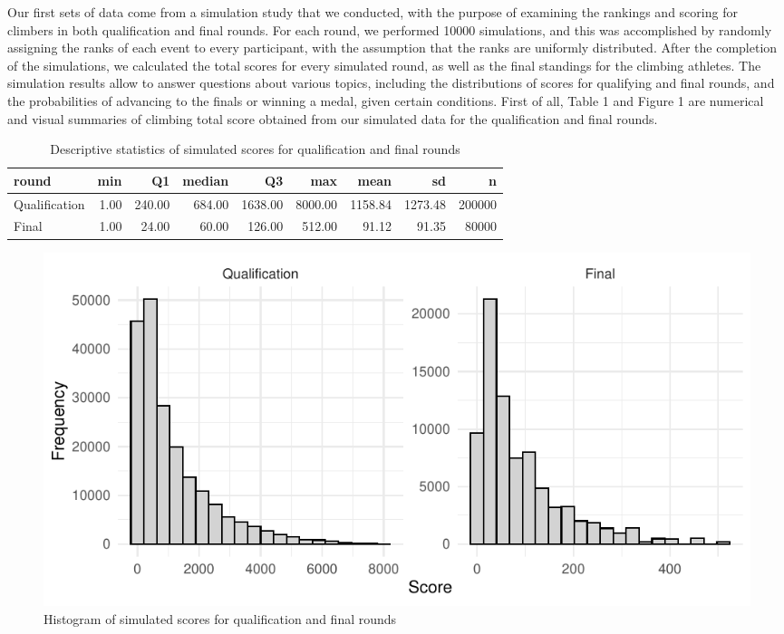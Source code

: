 \documentclass[12pt]{article}
\begin{document}
Our first sets of data come from a simulation study that we conducted,
with the purpose of examining the rankings and scoring for climbers in
both qualification and final rounds. For each round, we performed 10000
simulations, and this was accomplished by randomly assigning the ranks
of each event to every participant, with the assumption that the ranks
are uniformly distributed. After the completion of the simulations, we
calculated the total scores for every simulated round, as well as the
final standings for the climbing athletes. The simulation results allow
to answer questions about various topics, including the distributions of
scores for qualifying and final rounds, and the probabilities of
advancing to the finals or winning a medal, given certain conditions.
First of all, Table 1 and Figure 1 are numerical and visual summaries of
climbing total score obtained from our simulated data for the
qualification and final rounds.

\begin{table}[ht]
\centering
\caption{Descriptive statistics of simulated scores for qualification and final rounds} 
\begin{tabular}{lrrrrrrrr}
  \hline
round & min & Q1 & median & Q3 & max & mean & sd & n \\ 
  \hline
Qualification & 1.00 & 240.00 & 684.00 & 1638.00 & 8000.00 & 1158.84 & 1273.48 & 200000 \\ 
  Final & 1.00 & 24.00 & 60.00 & 126.00 & 512.00 & 91.12 & 91.35 & 80000 \\ 
   \hline
\end{tabular}
\end{table}

\begin{figure}
\centering
\includegraphics{draft_files/figure-latex/unnamed-chunk-5-1.pdf}
\caption{Histogram of simulated scores for qualification and final
rounds}
\end{figure}
\end{document}
